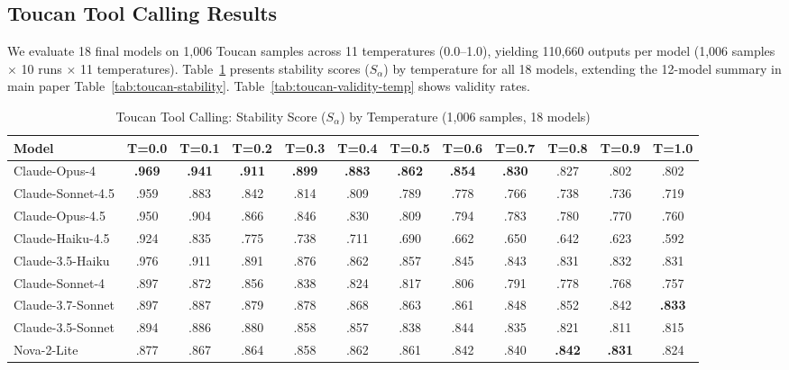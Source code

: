 \documentclass{article}
\theoremstyle{plain}
\theoremstyle{definition}
\begin{document}
\subsection{Toucan Tool Calling Results}
\label{sec:toucan-full-results}

We evaluate 18 final models on 1,006 Toucan samples across 11 temperatures (0.0--1.0), yielding 110,660 outputs per model (1,006 samples $\times$ 10 runs $\times$ 11 temperatures). Table~\ref{tab:toucan-full-temp} presents stability scores ($S_\alpha$) by temperature for all 18 models, extending the 12-model summary in main paper Table~\ref{tab:toucan-stability}. Table~\ref{tab:toucan-validity-temp} shows validity rates.

\begin{table}[t]
\centering
\caption{Toucan Tool Calling: Stability Score ($S_\alpha$) by Temperature (1,006 samples, 18 models)}
\label{tab:toucan-full-temp}
\scriptsize
\begin{tabular}{@{}lccccccccccc@{}}
\toprule
\textbf{Model} & \textbf{T=0.0} & \textbf{T=0.1} & \textbf{T=0.2} & \textbf{T=0.3} & \textbf{T=0.4} & \textbf{T=0.5} & \textbf{T=0.6} & \textbf{T=0.7} & \textbf{T=0.8} & \textbf{T=0.9} & \textbf{T=1.0} \\
\midrule
Claude-Opus-4 & \textbf{.969} & \textbf{.941} & \textbf{.911} & \textbf{.899} & \textbf{.883} & \textbf{.862} & \textbf{.854} & \textbf{.830} & .827 & .802 & .802 \\
Claude-Sonnet-4.5 & .959 & .883 & .842 & .814 & .809 & .789 & .778 & .766 & .738 & .736 & .719 \\
Claude-Opus-4.5 & .950 & .904 & .866 & .846 & .830 & .809 & .794 & .783 & .780 & .770 & .760 \\
Claude-Haiku-4.5 & .924 & .835 & .775 & .738 & .711 & .690 & .662 & .650 & .642 & .623 & .592 \\
Claude-3.5-Haiku & .976 & .911 & .891 & .876 & .862 & .857 & .845 & .843 & .831 & .832 & .831 \\
Claude-Sonnet-4 & .897 & .872 & .856 & .838 & .824 & .817 & .806 & .791 & .778 & .768 & .757 \\
Claude-3.7-Sonnet & .897 & .887 & .879 & .878 & .868 & .863 & .861 & .848 & .852 & .842 & \textbf{.833} \\
Claude-3.5-Sonnet & .894 & .886 & .880 & .858 & .857 & .838 & .844 & .835 & .821 & .811 & .815 \\
Nova-2-Lite & .877 & .867 & .864 & .858 & .862 & .861 & .842 & .840 & \textbf{.842} & \textbf{.831} & .824 \\

\end{tabular}
\end{table}
\end{document}
